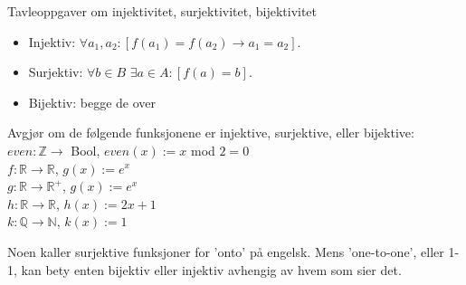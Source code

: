 \begin{frame}{Tavleoppgaver om injektivitet, surjektivitet, bijektivitet}
    \begin{itemize}
        \item Injektiv:  $\forall a_1, a_2 : [f(a_1) = f(a_2) \rightarrow a_1 = a_2]$.\\
        \item Surjektiv: $\forall b \in B$  $\exists a \in A : [f(a) = b]$.\\
        \item Bijektiv: begge de over \\
    \end{itemize}
    \pause
    \begin{block}{Avgjør om de følgende funksjonene er injektive, surjektive, eller bijektive:}
        $even : \mathbb{Z} \rightarrow $ Bool, $even(x) := x$ mod $2 = 0$\\
        $f : \mathbb{R} \rightarrow \mathbb{R}$, $g(x) := e^x$\\
        $g : \mathbb{R} \rightarrow \mathbb{R}^+$, $g(x) := e^x$\\
        $h : \mathbb{R} \rightarrow \mathbb{R}$, $h(x) := 2x + 1$\\
        $k : \mathbb{Q} \rightarrow \mathbb{N}$, $k(x) := 1$\\
    \end{block}
    \pause
    Noen kaller surjektive funksjoner for 'onto' på engelsk. Mens 'one-to-one', eller 1-1, kan bety enten bijektiv eller injektiv avhengig av hvem som sier det.
\end{frame}

